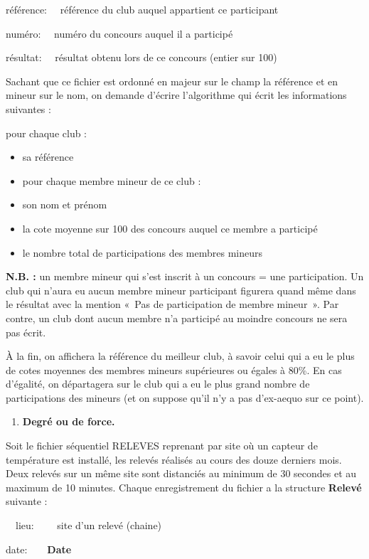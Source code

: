 {
référence: \ \ référence du club auquel appartient ce participant}

{
numéro: \ \ numéro du concours auquel il a participé}

{
résultat: \ \ résultat obtenu lors de ce concours (entier sur 100)}

{
Sachant que ce fichier est ordonné en majeur sur le champ la référence
et en mineur sur le nom, on demande d’écrire l’algorithme qui écrit les
informations suivantes :}

{
pour chaque club :}

\liststyleListv
\begin{itemize}
\item {
sa référence}
\item {
pour chaque membre mineur de ce club :}
\item {
son nom et prénom}
\item {
la cote moyenne sur 100 des concours auquel ce membre a participé}
\item {
le nombre total de participations des membres mineurs}
\end{itemize}
{
\textbf{N.B. : }un membre mineur qui s’est inscrit à un concours = une
participation. Un club qui n’aura eu aucun membre mineur participant
figurera quand même dans le résultat avec la mention «~Pas de
participation de membre mineur~». Par contre, un club dont aucun membre
n’a participé au moindre concours ne sera pas écrit.}

{
À la fin, on affichera la référence du meilleur club, à savoir celui qui
a eu le plus de cotes moyennes des membres mineurs supérieures ou
égales à 80\%. En cas d’égalité, on départagera sur le club qui a eu le
plus grand nombre de participations des mineurs (et on suppose qu’il
n’y a pas d’ex-aequo sur ce point). }

\liststyleExercice
\begin{enumerate}
\item {\sffamily\bfseries
Degré ou de force.}
\end{enumerate}
{
Soit le fichier séquentiel RELEVES reprenant par site où un capteur de
température est installé, les relevés réalisés au cours des douze
derniers mois. Deux relevés sur un même site sont distanciés au minimum
de 30 secondes et au maximum de 10 minutes. Chaque enregistrement du
fichier a la structure \textbf{Relevé} suivante :}

{
\ \ lieu: \ \ \ \ site d’un relevé (chaine)}

{
date:\ \ \ \ \textbf{Date}}

